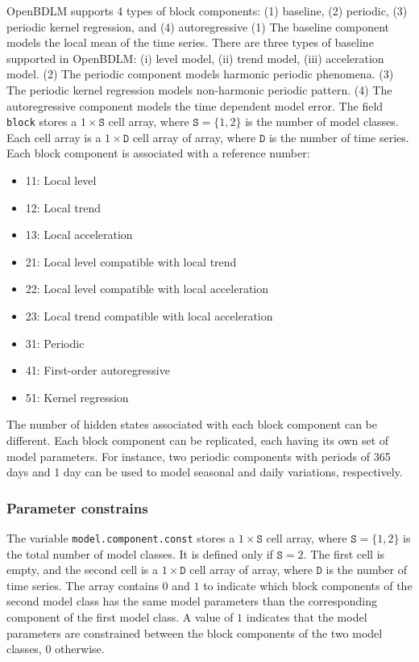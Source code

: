 OpenBDLM supports 4 types of block components: (1) baseline, (2) periodic, (3) periodic kernel regression, and (4) autoregressive 
(1) The baseline component models the local mean of the time series. 
There are three types of baseline supported in OpenBDLM: (i) level model, (ii) trend model, (iii) acceleration model. 
(2) The periodic component models harmonic periodic phenomena. %
(3) The periodic kernel regression models non-harmonic periodic pattern.
(4) The autoregressive component models the time dependent model error.
The field \lstinline[basicstyle = \mlttfamily \small ]!block! stores a $1\times \mathtt{S}$ cell array, where $\mathtt{S} = \{1,2 \}$ is the number of model classes.
Each cell array is a $1\times \mathtt{D}$ cell array of array, where $\mathtt{D}$ is the number of time series.
Each block component is associated with a reference number:
\begin{itemize}
\item 11: Local level 
\item 12: Local trend
\item 13: Local acceleration
\item 21: Local level compatible with local trend
\item 22: Local level compatible with local acceleration
\item 23: Local trend compatible with local acceleration
\item 31: Periodic
\item 41: First-order autoregressive
\item 51: Kernel regression
\end{itemize}
The number of hidden states associated with each block component can be different. 
Each block component can be replicated, each having its own set of model parameters. 
For instance, two periodic components with periods of 365 days and 1 day can be used to model seasonal and daily variations, respectively.

\subsubsection{Parameter constrains}

The variable \lstinline[basicstyle = \mlttfamily]!model.component.const! stores a $1\times \mathtt{S}$ cell array, where $\mathtt{S} = \{1, 2 \}$ is the total number of model classes.
It is defined only if $\mathtt{S} = 2$.
The first cell is empty, and the second cell is a $1\times \mathtt{D}$ cell array of array, where $\mathtt{D}$ is the number of time series.
The array contains $0$ and $1$ to indicate which block components of the second model class has the same model parameters than the corresponding component of the first model class. 
A value of $1$ indicates that the model parameters are constrained between the block components of the two model classes, $0$ otherwise.

